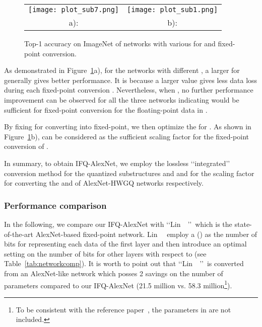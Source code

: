 \documentclass[10pt,twocolumn,letterpaper]{article}
\begin{document}
\begin{figure}[!ht]
\begin{center}
\begin{tabular} {@{}cc@{}}
\texttt{[image: plot\_sub7.png]} &
\texttt{[image: plot\_sub1.png]} \\
 a): & b):
\end{tabular}
\caption{Top-1 accuracy on ImageNet of networks with various  for  and  fixed-point conversion.}
\label{fig:sub7}
\end{center}
\end{figure}

As demonstrated in Figure~\ref{fig:sub7}a), for the networks with different , a larger  for  generally gives better performance. It is because a larger  value gives less data loss during each fixed-point conversion . Nevertheless, when , no further performance improvement can be observed for all the three networks indicating  would be sufficient for fixed-point conversion for the floating-point data in .

By fixing  for converting  into fixed-point, we then optimize the  for . As shown in Figure~\ref{fig:sub7}b),  can be considered as the sufficient scaling factor for the fixed-point conversion of .



 In summary, to obtain IFQ-AlexNet, we employ the lossless \lq\lq integrated\rq\rq\, conversion method for the quantized substructures and  and  for the scaling factor  for converting the   and  of AlexNet-HWGQ networks respectively.



\subsubsection{Performance comparison} \label{sec:4.1.3}

In the following, we compare our IFQ-AlexNet with \lq\lq Lin~\etal~\cite{LinFixPoint}\rq\rq\, which is the state-of-the-art AlexNet-based fixed-point network. Lin~\etal~\cite{LinFixPoint} employ a  () as the number of bits for representing each data of the first layer and then introduce an optimal setting on the number of bits for other layers with respect to   (see Table~\ref{tab:networkcomp}). It is worth to point out that \lq\lq Lin~\etal~\cite{LinFixPoint}\rq\rq\, is converted from an AlexNet-like network which posses 2 savings on the number of parameters compared to our IFQ-AlexNet (21.5 million vs. 58.3 million\footnote{To be consistent with the reference paper~\cite{LinFixPoint}, the parameters in  are not included.}).
\end{document}
